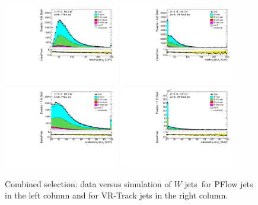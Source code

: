 \begin{figure}[bth]
		\centering
		\includegraphics[width=0.45\textwidth]{FTAG_plots/pretagNoRwwithhighpTPFlowall/DataMC_h_J0_pt.pdf}
		\includegraphics[width=0.45\textwidth]{FTAG_plots/pretagNoRwwithhighpTVRJetsall/DataMC_h_J0_pttrackjet.pdf}\\
		\includegraphics[width=0.45\textwidth]{FTAG_plots/pretagNoRwwithhighpTPFlowall/DataMC_h_J1_pt.pdf}
		\includegraphics[width=0.45\textwidth]{FTAG_plots/pretagNoRwwithhighpTVRJetsall/DataMC_h_J1_pttrackjet.pdf}\\
		\caption{Combined selection: data versus simulation of $W$ jets\pt\ for 
		PFlow jets in the left column and for VR-Track jets in the right column.}
		\label{fig:kinematic_distributions_combined}
\end{figure}
		

